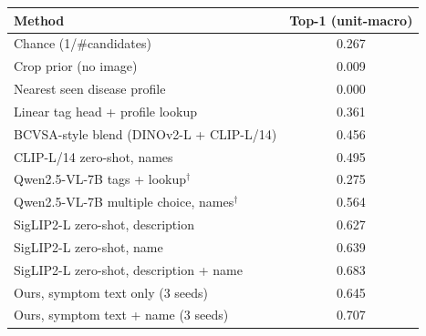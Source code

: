 \begin{tabular}{lc}\toprule Method & Top-1 (unit-macro)\\\midrule
Chance (1/\#candidates) & 0.267\\
Crop prior (no image) & 0.009\\
Nearest seen disease profile & 0.000\\
Linear tag head + profile lookup & 0.361\\
BCVSA-style blend (DINOv2-L + CLIP-L/14) & 0.456\\
CLIP-L/14 zero-shot, names & 0.495\\
Qwen2.5-VL-7B tags + lookup$^\dagger$ & 0.275\\
Qwen2.5-VL-7B multiple choice, names$^\dagger$ & 0.564\\
SigLIP2-L zero-shot, description & 0.627\\
SigLIP2-L zero-shot, name & 0.639\\
SigLIP2-L zero-shot, description + name & 0.683\\
Ours, symptom text only (3 seeds) & 0.645\\
Ours, symptom text + name (3 seeds) & 0.707\\
\bottomrule\end{tabular}
